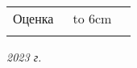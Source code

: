 \vspace{1cm}
\noindent
\begin{tabular}{@{}l@{}c}
    Оценка~        & \hbox to 6cm{\hfill ~~ \hfill} \\\cline{2-2}
    \hspace{1.5cm} &  \textit{\footnotesize}
\end{tabular}

\begin{center}	
	\vfill
	\large \textit {2023 г.}
\end{center}

\thispagestyle{empty}
\pagebreak